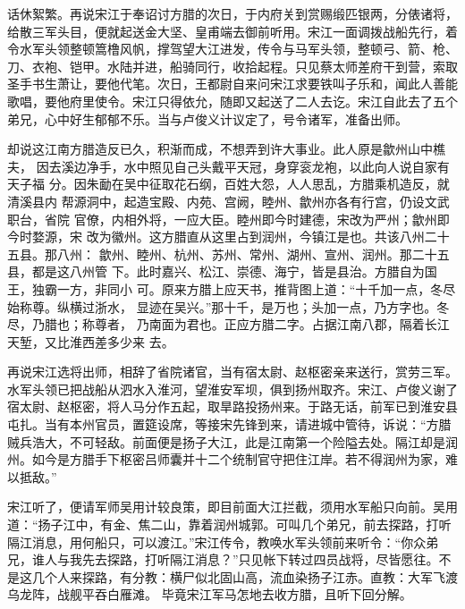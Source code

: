 话休絮繁。再说宋江于奉诏讨方腊的次日，于内府关到赏赐缎匹银两，分俵诸将，
给散三军头目，便就起送金大坚、皇甫端去御前听用。宋江一面调拨战船先行，着
令水军头领整顿篙橹风帆，撑驾望大江进发，传令与马军头领，整顿弓、箭、枪、
刀、衣袍、铠甲。水陆并进，船骑同行，收拾起程。只见蔡太师差府干到营，索取
圣手书生萧让，要他代笔。次日，王都尉自来问宋江求要铁叫子乐和，闻此人善能
歌唱，要他府里使令。宋江只得依允，随即又起送了二人去讫。宋江自此去了五个
弟兄，心中好生郁郁不乐。当与卢俊义计议定了，号令诸军，准备出师。

却说这江南方腊造反已久，积渐而成，不想弄到许大事业。此人原是歙州山中樵夫，
因去溪边净手，水中照见自己头戴平天冠，身穿衮龙袍，以此向人说自家有天子福
分。因朱勔在吴中征取花石纲，百姓大怨，人人思乱，方腊乘机造反，就清溪县内
帮源洞中，起造宝殿、内苑、宫阙，睦州、歙州亦各有行宫，仍设文武职台，省院
官僚，内相外将，一应大臣。睦州即今时建德，宋改为严州；歙州即今时婺源，宋
改为徽州。这方腊直从这里占到润州，今镇江是也。共该八州二十五县。那八州：
歙州、睦州、杭州、苏州、常州、湖州、宣州、润州。那二十五县，都是这八州管
下。此时嘉兴、松江、崇德、海宁，皆是县治。方腊自为国王，独霸一方，非同小
可。原来方腊上应天书，推背图上道：“十千加一点，冬尽始称尊。纵横过浙水，
显迹在吴兴。”那十千，是万也；头加一点，乃方字也。冬尽，乃腊也；称尊者，
乃南面为君也。正应方腊二字。占据江南八郡，隔着长江天堑，又比淮西差多少来
去。

再说宋江选将出师，相辞了省院诸官，当有宿太尉、赵枢密亲来送行，赏劳三军。
水军头领已把战船从泗水入淮河，望淮安军坝，俱到扬州取齐。宋江、卢俊义谢了
宿太尉、赵枢密，将人马分作五起，取旱路投扬州来。于路无话，前军已到淮安县
屯扎。当有本州官员，置筵设席，等接宋先锋到来，请进城中管待，诉说：“方腊
贼兵浩大，不可轻敌。前面便是扬子大江，此是江南第一个险隘去处。隔江却是润
州。如今是方腊手下枢密吕师囊并十二个统制官守把住江岸。若不得润州为家，难
以抵敌。”

宋江听了，便请军师吴用计较良策，即目前面大江拦截，须用水军船只向前。吴用
道：“扬子江中，有金、焦二山，靠着润州城郭。可叫几个弟兄，前去探路，打听
隔江消息，用何船只，可以渡江。”宋江传令，教唤水军头领前来听令：“你众弟
兄，谁人与我先去探路，打听隔江消息？”只见帐下转过四员战将，尽皆愿往。不
是这几个人来探路，有分教：横尸似北固山高，流血染扬子江赤。直教：大军飞渡
乌龙阵，战舰平吞白雁滩。
毕竟宋江军马怎地去收方腊，且听下回分解。